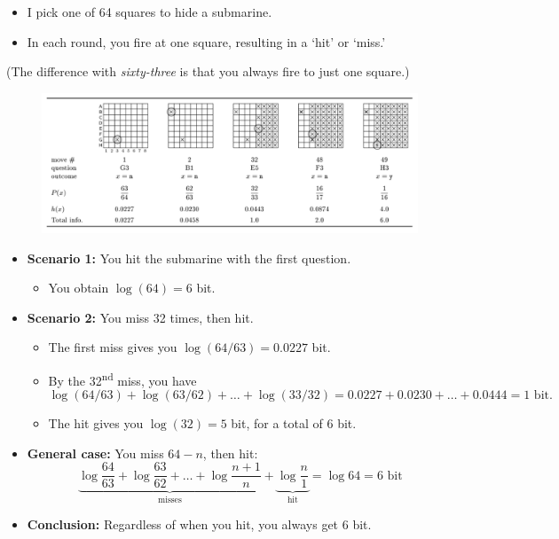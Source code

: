 \begin{itemize}
    \item I pick one of 64 squares to hide a submarine.
    \item In each round, you fire at one square, resulting in a ‘hit’ or ‘miss.’
\end{itemize}

(The difference with \textit{sixty-three} is that you always fire to just one square.)

\begin{figure}
    \includegraphics[width=0.9\linewidth]{img/submarines.png}
\end{figure}

\begin{itemize}
    \item \textbf{Scenario 1:} You hit the submarine with the first question.
    \begin{itemize}
        \item You obtain \( \log(64) = 6 \) bit.
    \end{itemize}

    \item \textbf{Scenario 2:} You miss 32 times, then hit.
    \begin{itemize}
        \item The first miss gives you \( \log(64/63) = 0.0227 \) bit.
        \item By the 32\textsuperscript{nd} miss, you have
        \[
            \log(64/63) + \log(63/62) + \dots + \log(33/32) = 0.0227 + 0.0230 + \dots + 0.0444 = 1 \text{ bit}.
        \]
        \item The hit gives you \( \log(32) = 5 \) bit, for a total of 6 bit.
    \end{itemize}

    \item \textbf{General case:} You miss \( 64 - n \), then hit:
    \[
        \underbrace{\log \frac{64}{63} + \log \frac{63}{62} + \dots + \log \frac{n+1}{n}}_{\text{misses}} + \underbrace{\log \frac{n}{1}}_{\text{hit}} = \log 64 = 6 \text{ bit}
    \]

    \item \textbf{Conclusion:} Regardless of when you hit, you always get 6 bit.
\end{itemize}

